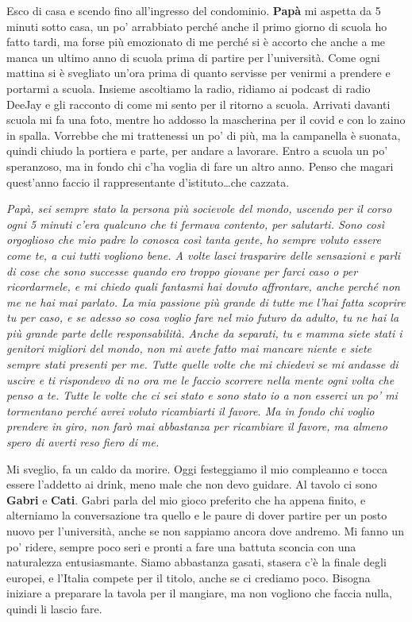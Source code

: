 Esco di casa e scendo fino all'ingresso del condominio. \textbf{Papà} mi aspetta da 5 minuti sotto casa, un po' arrabbiato perché anche il primo giorno di scuola ho fatto tardi, ma forse più emozionato di me perché si è accorto che anche a me manca un ultimo anno di scuola prima di partire per l'università. Come ogni mattina si è svegliato un'ora prima di quanto servisse per venirmi a prendere e portarmi a scuola. Insieme ascoltiamo la radio, ridiamo ai podcast di radio DeeJay e gli racconto di come mi sento per il ritorno a scuola. Arrivati davanti scuola mi fa una foto, mentre ho addosso la mascherina per il covid e con lo zaino in spalla. Vorrebbe che mi trattenessi un po' di più, ma la campanella è suonata, quindi chiudo la portiera e parte, per andare a lavorare. Entro a scuola un po' speranzoso, ma in fondo chi c'ha voglia di fare un altro anno. Penso che magari quest'anno faccio il rappresentante d'istituto\dots che cazzata.
\vspace{5mm}

\textit{Papà, sei sempre stato la persona più socievole del mondo, uscendo per il corso ogni 5 minuti c'era qualcuno che ti fermava contento, per salutarti. Sono così orgoglioso che mio padre lo conosca così tanta gente, ho sempre voluto essere come te, a cui tutti vogliono bene. A volte lasci trasparire delle sensazioni e parli di cose che sono successe quando ero troppo giovane per farci caso o per ricordarmele, e mi chiedo quali fantasmi hai dovuto affrontare, anche perché non me ne hai mai parlato. La mia passione più grande di tutte me l'hai fatta scoprire tu per caso, e se adesso so cosa voglio fare nel mio futuro da adulto, tu ne hai la più grande parte delle responsabilità. Anche da separati, tu e mamma siete stati i genitori migliori del mondo, non mi avete fatto mai mancare niente e siete sempre stati presenti per me. Tutte quelle volte che mi chiedevi se mi andasse di uscire e ti rispondevo di no ora me le faccio scorrere nella mente ogni volta che penso a te. Tutte le volte che ci sei stato e sono stato io a non esserci un po' mi tormentano perché avrei voluto ricambiarti il favore. Ma in fondo chi voglio prendere in giro, non farò mai abbastanza per ricambiare il favore, ma almeno spero di averti reso fiero di me.}

\separatore

Mi sveglio, fa un caldo da morire. Oggi festeggiamo il mio compleanno e tocca essere l'addetto ai drink, meno male che non devo guidare. Al tavolo ci sono \textbf{Gabri} e \textbf{Cati}. Gabri parla del mio gioco preferito che ha appena finito, e alterniamo la conversazione tra quello e le paure di dover partire per un posto nuovo per l'università, anche se non sappiamo ancora dove andremo. Mi fanno un po' ridere, sempre poco seri e pronti a fare una battuta sconcia con una naturalezza entusiasmante. Siamo abbastanza gasati, stasera c'è la finale degli europei, e l'Italia compete per il titolo, anche se ci crediamo poco. Bisogna iniziare a preparare la tavola per il mangiare, ma non vogliono che faccia nulla, quindi li lascio fare.
\vspace{5mm}


